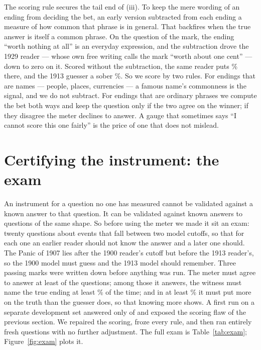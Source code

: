 \documentclass[11pt]{article}
\begin{document}
The scoring rule secures the tail end of (iii). To keep the mere wording of an ending from deciding the
bet, an early version subtracted from each ending a measure of how common that phrase is in general. That
backfires when the true answer is itself a common phrase. On the question of the mark, the ending ``worth
nothing at all'' is an everyday expression, and the subtraction drove the 1929 reader --- whose own free
writing calls the mark ``worth about one cent'' --- down to zero on it. Scored without the subtraction, the
same reader puts \NmarkRawTN\% there, and the 1913 guesser a sober \NmarkRawTh\%. So we score by two rules.
For endings that are names --- people, places, currencies --- a famous name's commonness is the signal, and
we do not subtract. For endings that are ordinary phrases we compute the bet both ways and keep the
question only if the two agree on the winner; if they disagree the meter declines to answer. A gauge that
sometimes says ``I cannot score this one fairly'' is the price of one that does not mislead.

\section{Certifying the instrument: the exam}\label{sec:exam}

An instrument for a question no one has measured cannot be validated against a known answer to that
question. It can be validated against known answers to questions of the same shape. So before using the
meter we made it sit an exam: twenty questions about events that fall between two model cutoffs, so that for
each one an earlier reader should not know the answer and a later one should. The Panic of 1907 lies after
the 1900 reader's cutoff but before the 1913 reader's, so the 1900 model must guess and the 1913 model
should remember. Three passing marks were written down before anything was run. The meter must agree to
answer at least \NbarAnswer{} of the \NexamTotal{} questions; among those it answers, the witness must name
the true ending at least \NbarCorrect\% of the time; and in at least \NbarOutbet\% it must put more on the
truth than the guesser does, so that knowing more shows. A first run on a separate development set answered
only \NdevAnswered{} of \NdevTotal{} and exposed the scoring flaw of the previous section. We repaired the
scoring, froze every rule, and then ran \NexamTotal{} entirely fresh questions with no further adjustment.
The full exam is Table~\ref{tab:exam}; Figure~\ref{fig:exam} plots it.
\end{document}
